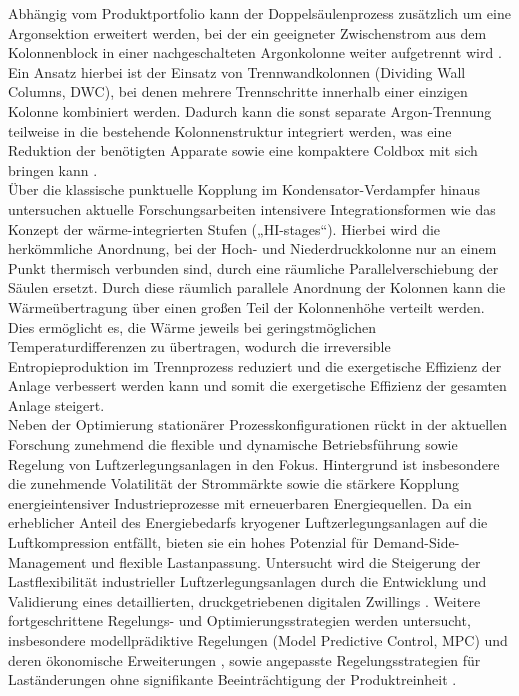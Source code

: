 Abhängig vom Produktportfolio kann der Doppelsäulenprozess zusätzlich um eine Argonsektion erweitert werden, bei der ein geeigneter Zwischenstrom aus dem Kolonnenblock in einer nachgeschalteten Argonkolonne weiter aufgetrennt wird \cite{youngDetailedDesignEconomic2021}. Ein Ansatz hierbei ist der Einsatz von Trennwandkolonnen (Dividing Wall Columns, DWC), bei denen mehrere Trennschritte innerhalb einer einzigen Kolonne kombiniert werden. Dadurch kann die sonst separate Argon-Trennung teilweise in die bestehende Kolonnenstruktur integriert werden, was eine Reduktion der benötigten Apparate sowie eine kompaktere Coldbox mit sich bringen kann \cite{madenoorramapriyaSystematicMethodSynthesize2018}. \\
Über die klassische punktuelle Kopplung im Kondensator-Verdampfer hinaus untersuchen aktuelle Forschungsarbeiten  intensivere Integrationsformen wie das Konzept der wärme-integrierten Stufen („HI-stages“). Hierbei wird die herkömmliche Anordnung, bei der Hoch- und Niederdruckkolonne nur an einem Punkt thermisch verbunden sind, durch eine räumliche Parallelverschiebung der Säulen ersetzt. Durch diese räumlich parallele Anordnung der Kolonnen kann die Wärmeübertragung über einen großen Teil der Kolonnenhöhe verteilt werden. Dies ermöglicht es, die Wärme jeweils bei geringstmöglichen Temperaturdifferenzen zu übertragen, wodurch die irreversible Entropieproduktion im Trennprozess reduziert und die exergetische Effizienz der Anlage verbessert werden kann und somit die exergetische Effizienz der gesamten Anlage steigert. \cite{vanderhamImprovingHeatIntegration2011}\\
Neben der Optimierung stationärer Prozesskonfigurationen rückt in der aktuellen Forschung zunehmend die flexible und dynamische Betriebsführung sowie Regelung von Luftzerlegungsanlagen in den Fokus. Hintergrund ist insbesondere die zunehmende Volatilität der Strommärkte sowie die stärkere Kopplung energieintensiver Industrieprozesse mit erneuerbaren Energiequellen. Da ein erheblicher Anteil des Energiebedarfs kryogener Luftzerlegungsanlagen auf die Luftkompression entfällt, bieten sie ein hohes Potenzial für Demand-Side-Management und flexible Lastanpassung. Untersucht wird die Steigerung der Lastflexibilität industrieller Luftzerlegungsanlagen durch die Entwicklung und Validierung eines detaillierten, druckgetriebenen digitalen Zwillings \cite{kenderImprovingLoadFlexibility2022}. Weitere fortgeschrittene Regelungs- und Optimierungsstrategien werden untersucht, insbesondere modellprädiktive Regelungen (Model Predictive Control, MPC) und deren ökonomische Erweiterungen \cite{quarshieEconomicModelPredictive2024}, sowie angepasste Regelungsstrategien für Laständerungen ohne signifikante Beeinträchtigung der Produktreinheit \cite{chengFlexibleCryogenicAir2022}.\\
